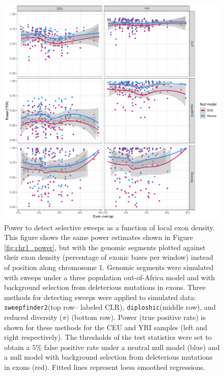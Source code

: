 \documentclass[hidelinks]{article}
\newcommand{\stopsupplement}{%
        \setcounter{table}{0}
        \renewcommand{\thetable}{\arabic{table}}%
        \setcounter{figure}{0}
        \renewcommand{\thefigure}{\arabic{figure}}%
     }
\newcommand{\sweepfinder}{\texttt{sweepfinder2}\xspace}
\newcommand{\diploshic}{\texttt{diploshic}\xspace}
\begin{document}
\begin{figure}[h]
    \centering
    \includegraphics[width=0.8 \textwidth]{figures/sweeps/relationship_power_exon.pdf}
    \caption{
        Power to detect selective sweeps
        as a function of local exon density.
        This figure shows the same power estimates shown in Figure \ref{fig:chr1_power},
        but with the genomic segments plotted against their
        exon density (percentage of exonic bases per window) instead of position along chromosome 1.
    	Genomic segments were simulated with sweeps under a three population out-of-Africa model
        and with background selection from deleterious mutations in exons.
        Three methods for detecting sweeps were applied to simulated data:
        \sweepfinder (top row-- labeled CLR),
        \diploshic (middle row),
        and reduced diversity ($\pi$) (bottom row).
        Power (true positive rate) is shown for these methods for the CEU and YRI
        samples (left and right respectively).
        The thresholds of the test statistics were set to obtain a
        $5\%$ false positive rate under a neutral null model (blue)
        and a null model with background selection from deleterious mutations in exons (red).
        Fitted lines represent loess smoothed regressions.
    }
    \label{fig:power-exon}
\end{figure}

\stopsupplement
\end{document}
